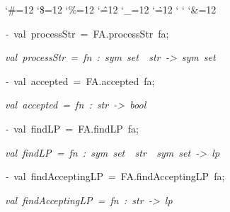 \begin{list}{}
{\setlength{\leftmargin}{\leftmargini}
\setlength{\rightmargin}{0cm}
\setlength{\itemindent}{0cm}
\setlength{\listparindent}{0cm}
\setlength{\itemsep}{0cm}
\setlength{\parsep}{0cm}
\setlength{\labelsep}{0cm}
\setlength{\labelwidth}{0cm}
\catcode`\#=12
\catcode`\$=12
\catcode`\%=12
\catcode`\^=12
\catcode`\_=12
\catcode`\.=12
\catcode`
\catcode`
\catcode`\&=12
\ttfamily}
\small
\item[]\textsl{-\ }val\ processStr\ =\ FA.processStr\ fa;
\item[]\textsl{val\ processStr\ =\ fn\ :\ sym\ set\ \ str\ ->\ sym\ set}
\item[]\textsl{-\ }val\ accepted\ =\ FA.accepted\ fa;
\item[]\textsl{val\ accepted\ =\ fn\ :\ str\ ->\ bool}
\item[]\textsl{-\ }val\ findLP\ =\ FA.findLP\ fa;
\item[]\textsl{val\ findLP\ =\ fn\ :\ sym\ set\ \ str\ \ sym\ set\ ->\ lp}
\item[]\textsl{-\ }val\ findAcceptingLP\ =\ FA.findAcceptingLP\ fa;
\item[]\textsl{val\ findAcceptingLP\ =\ fn\ :\ str\ ->\ lp}
\end{list}
